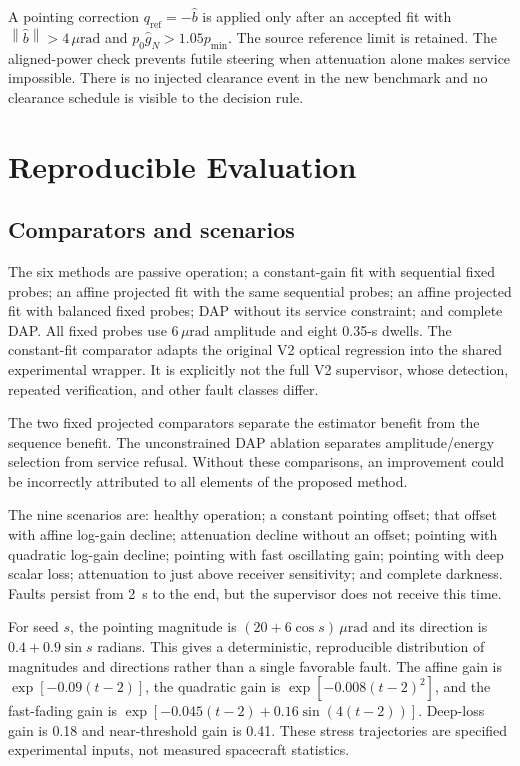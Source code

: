 \documentclass[journal]{IEEEtran}
\newcommand{\norm}[1]{\left\lVert#1\right\rVert}
\newcommand{\um}{\,\mu\mathrm{rad}}
\begin{document}
A pointing correction $q_{\mathrm{ref}}=-\widehat b$ is applied only after an accepted fit with $\norm{\widehat b}>4\um$ and $p_0\widehat g_N>1.05p_{\min}$. The source reference limit is retained. The aligned-power check prevents futile steering when attenuation alone makes service impossible. There is no injected clearance event in the new benchmark and no clearance schedule is visible to the decision rule.

\section{Reproducible Evaluation}
\subsection{Comparators and scenarios}
The six methods are passive operation; a constant-gain fit with sequential fixed probes; an affine projected fit with the same sequential probes; an affine projected fit with balanced fixed probes; DAP without its service constraint; and complete DAP. All fixed probes use $6\um$ amplitude and eight 0.35-s dwells. The constant-fit comparator adapts the original V2 optical regression into the shared experimental wrapper. It is explicitly not the full V2 supervisor, whose detection, repeated verification, and other fault classes differ.

The two fixed projected comparators separate the estimator benefit from the sequence benefit. The unconstrained DAP ablation separates amplitude/energy selection from service refusal. Without these comparisons, an improvement could be incorrectly attributed to all elements of the proposed method.

The nine scenarios are: healthy operation; a constant pointing offset; that offset with affine log-gain decline; attenuation decline without an offset; pointing with quadratic log-gain decline; pointing with fast oscillating gain; pointing with deep scalar loss; attenuation to just above receiver sensitivity; and complete darkness. Faults persist from 2~s to the end, but the supervisor does not receive this time.

For seed $s$, the pointing magnitude is $(20+6\cos s)\um$ and its direction is $0.4+0.9\sin s$ radians. This gives a deterministic, reproducible distribution of magnitudes and directions rather than a single favorable fault. The affine gain is $\exp[-0.09(t-2)]$, the quadratic gain is $\exp[-0.008(t-2)^2]$, and the fast-fading gain is $\exp[-0.045(t-2)+0.16\sin(4(t-2))]$. Deep-loss gain is 0.18 and near-threshold gain is 0.41. These stress trajectories are specified experimental inputs, not measured spacecraft statistics.
\end{document}
